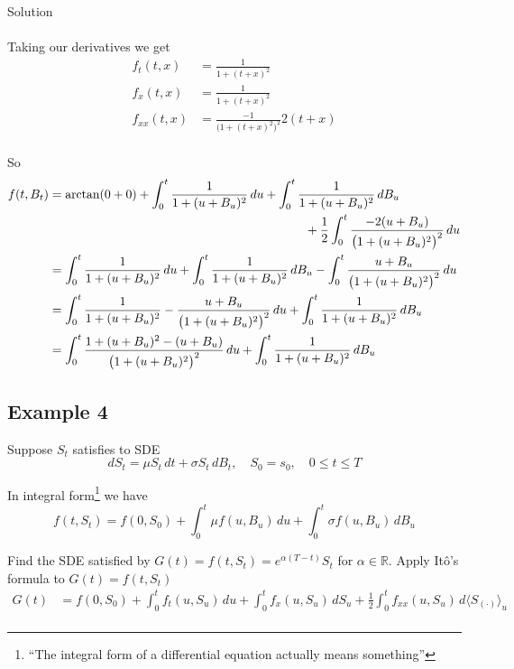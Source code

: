 \documentclass[12pt]{article}
\begin{document}
Solution \\
\\
Taking our derivatives we get
\begin{align*}
	f_t(t,x) &= \frac{1}{1 + (t + x)^2} \\
	f_x(t,x) &= \frac{1}{1 + (t + x)^2} \\
	f_{xx}(t,x) &= \frac{-1}{\big(1 + (t + x)^2\big)^2}2(t + x) \\
\end{align*}

So
\begin{align*}
	f(t,B_t) &= \arctan(0 + 0) + \int^t_0 \frac{1}{1 + (u + B_u)^2}\,du + \int^t_0 \frac{1}{1 + (u + B_u)^2}\,dB_u \\
	&\hphantom{{}={\arctan(0 + 0) + \int^t_0 \frac{1}{1 + (u + B_u)^2}\,du + \int^t_0}\frac{1}{1}} + \frac{1}{2}\int^t_0 \frac{-2(u + B_u)}{\big(1 + (u + B_u)^2\big)^2}\,du \\
	&= \int^t_0 \frac{1}{1 + (u + B_u)^2}\,du + \int^t_0 \frac{1}{1 + (u + B_u)^2}\,dB_u - \int^t_0 \frac{u + B_u}{\big(1 + (u + B_u)^2\big)^2}\,du \\
		&= \int^t_0 \frac{1}{1 + (u + B_u)^2} - \frac{u + B_u}{\big(1 + (u + B_u)^2\big)^2}\,du + \int^t_0 \frac{1}{1 + (u + B_u)^2}\,dB_u \\
		&= \int^t_0 \frac{1 + (u + B_u)^2 - (u + B_u)}{\big(1 + (u + B_u)^2\big)^2}\,du + \int^t_0 \frac{1}{1 + (u + B_u)^2}\,dB_u \\
\end{align*}


\subsection{Example 4}

Suppose $S_t$ satisfies to SDE
\begin{equation*}
	dS_t = \mu S_t\,dt + \sigma S_t\,dB_t, \quad S_0 = s_0, \quad 0\leq t\leq T
\end{equation*}

In integral form\footnote{``The integral form of a differential equation actually means something''} we have
\begin{equation*}
	f(t,S_t) = f(0,S_0) + \int^t_0 \mu f(u,B_u)\,du + \int^t_0 \sigma f(u,B_u)\,dB_u
\end{equation*}

Find the SDE satisfied by $G(t) = f(t,S_t) = e^{\alpha(T-t)}S_t$ for $\alpha\in\mathbb R$. Apply It\^{o}'s formula to $G(t) = f(t,S_t)$
\begin{align*}
	G(t) &= f(0,S_0) + \int^t_0 f_t(u,S_u)\,du + \int^t_0 f_x(u,S_u)\,dS_u + \frac{1}{2}\int^t_0 f_{xx}(u,S_u)\,d\langle S_{(\cdot)}\rangle_u \\
\end{align*}
\end{document}
